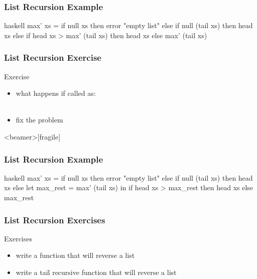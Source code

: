 \documentclass[dvipsnames]{beamer}
\theoremstyle{plain}
\begin{document}
\begin{frame}[fragile]
  \frametitle{List Recursion Example}

  \begin{example}
    \pause
    \begin{pygments}{haskell}
max' xs =
    if null xs
    then error "empty list"
    else if null (tail xs)
         then head xs
         else if head xs > max' (tail xs)
              then head xs
              else max' (tail xs)
    \end{pygments}
  \end{example}
\end{frame}

\begin{frame}[fragile]
  \frametitle{List Recursion Exercise}

  \begin{block}{Exercise}
    \begin{itemize}
      \item what happens if called as:\\
        \\
      \item fix the problem
   \end{itemize}
  \end{block}
\end{frame}

\begin{frame}<beamer>[fragile]
  \frametitle{List Recursion Example}

  \begin{example}
    \begin{pygments}{haskell}
max' xs =
    if null xs
    then error "empty list"
    else if null (tail xs)
         then head xs
         else
             let
                 max_rest = max' (tail xs)
             in
                 if head xs > max_rest
                 then head xs
                 else max_rest
    \end{pygments}
  \end{example}
\end{frame}

\begin{frame}
  \frametitle{List Recursion Exercises}

  \begin{block}{Exercises}
    \begin{itemize}
      \item write a function that will reverse a list
      \item write a tail recursive function that will reverse a list
    \end{itemize}
  \end{block}
\end{frame}
\end{document}
